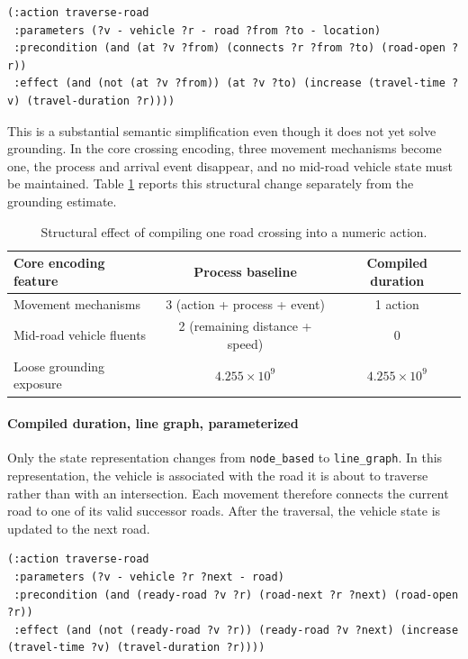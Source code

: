 \documentclass[10pt]{article}
\begin{document}
\vspace{0.5em}
\begin{lstlisting}
(:action traverse-road
 :parameters (?v - vehicle ?r - road ?from ?to - location)
 :precondition (and (at ?v ?from) (connects ?r ?from ?to) (road-open ?r))
 :effect (and (not (at ?v ?from)) (at ?v ?to) (increase (travel-time ?v) (travel-duration ?r))))
\end{lstlisting}

This is a substantial semantic simplification even though it does not yet solve
grounding. In the core crossing encoding, three movement mechanisms become one,
the process and arrival event disappear, and no mid-road vehicle state must be
maintained. Table \ref{tab:traversal-simplification} reports this structural
change separately from the grounding estimate.

\begin{table}[H]
\centering
\caption{Structural effect of compiling one road crossing into a numeric action.}
\label{tab:traversal-simplification}
\scriptsize
\begin{tabular}{@{}lcc@{}}
\toprule
Core encoding feature & Process baseline & Compiled duration \\
\midrule
Movement mechanisms & 3 (action + process + event) & 1 action \\
Mid-road vehicle fluents & 2 (remaining distance + speed) & 0 \\
Loose grounding exposure & $4.255\times10^9$ & $4.255\times10^9$ \\
\bottomrule
\end{tabular}
\end{table}


\paragraph{Compiled duration, line graph, parameterized}
Only the state representation changes from \texttt{node\_based} to \texttt{line\_graph}. In this representation, the vehicle is associated with the
road it is about to traverse rather than with an intersection. Each movement
therefore connects the current road to one of its valid successor roads. After
the traversal, the vehicle state is updated to the next road.

\vspace{0.5em}
\begin{lstlisting}
(:action traverse-road
 :parameters (?v - vehicle ?r ?next - road)
 :precondition (and (ready-road ?v ?r) (road-next ?r ?next) (road-open ?r))
 :effect (and (not (ready-road ?v ?r)) (ready-road ?v ?next) (increase (travel-time ?v) (travel-duration ?r))))
\end{lstlisting}
\end{document}
